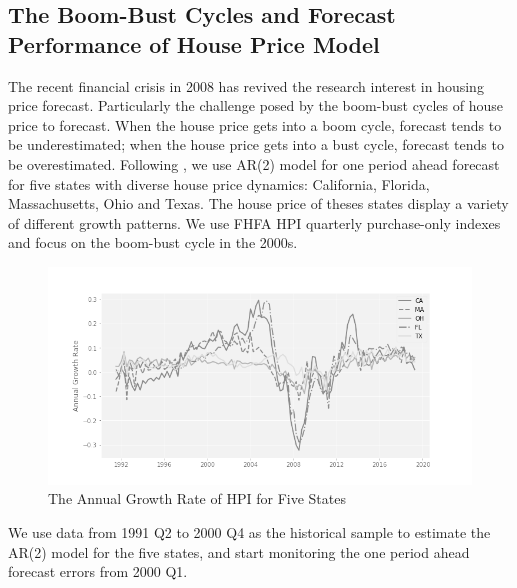 \documentclass[preprint,authoryear,12pt,english]{elsarticle}
\theoremstyle{plain}
\begin{document}
\subsection{The Boom-Bust Cycles and Forecast Performance of House Price Model}
The recent financial crisis in 2008 has revived the research interest in housing price forecast. Particularly the challenge posed by the boom-bust cycles of house price to forecast. When the house price gets into a boom cycle, forecast tends to be underestimated; when the house price gets into a bust cycle, forecast tends to be overestimated. Following \cite{Miles2008Boom-bustPrices}, we use AR(2) model for one period ahead forecast for five states with diverse house price dynamics: California, Florida, Massachusetts, Ohio and Texas. The house price of theses states display a variety of different growth patterns. We use FHFA HPI quarterly purchase-only indexes and focus on the boom-bust cycle in the 2000s.
\noindent
\begin{center}
    \begin{figure}[H]
        \centering
        \includegraphics[scale=0.55]{"graph/grayed_HPI_5States"}
        \protect\caption{\label{fig:5 states HPI}The Annual Growth Rate of HPI for Five States}

    \end{figure}
    \par\end{center}
We use data from 1991 Q2 to 2000 Q4 as the historical sample to estimate the AR(2) model for the five states, and start monitoring the one period ahead forecast errors from 2000 Q1.
\end{document}
